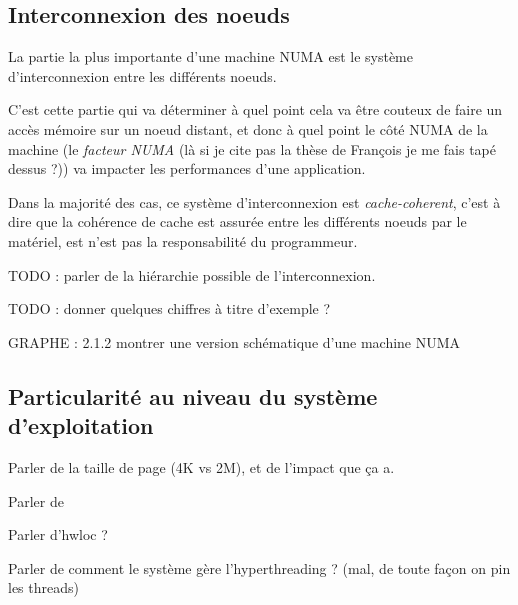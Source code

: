 \subsection{Interconnexion des noeuds}\label{sec:context:numa:interconnect}

La partie la plus importante d'une machine NUMA est le système d'interconnexion entre les différents noeuds.

C'est cette partie qui va déterminer à quel point cela va être couteux de faire un accès mémoire sur un noeud distant, et donc à quel point le côté NUMA de la machine (le \emph{facteur NUMA} (là si je cite pas la thèse de François je me fais tapé dessus ?)) va impacter les performances d'une application.

Dans la majorité des cas, ce système d'interconnexion est \emph{cache-coherent}, c'est à dire que la cohérence de cache est assurée entre les différents noeuds par le matériel, est n'est pas la responsabilité du programmeur.

TODO : parler de la hiérarchie possible de l'interconnexion.

TODO : donner quelques chiffres à titre d'exemple ?

GRAPHE : 2.1.2 montrer une version schématique d'une machine NUMA


\subsection{Particularité au niveau du système d'exploitation}\label{sec:context:numa:os}


Parler de la taille de page (4K vs 2M), et de l'impact que ça a.

Parler de~\cite{Dobson2003}

Parler d'hwloc ?

Parler de comment le système gère l'hyperthreading ? (mal, de toute façon on pin les threads)


